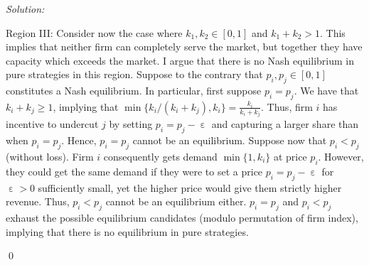 \documentclass[12pt]{article}
\DeclareMathOperator{\eps}{\varepsilon}
\newenvironment{sol}
    {\emph{Solution:}
    }
    {
    \qed
    }
\begin{document}
\begin{sol}
\begin{enumerate}[label=\alph*) ]
    Region III: Consider now the case where $k_1, k_2 \in [0,1]$ and $k_1 + k_2 > 1$. This implies that neither firm can completely serve the market, but together they have capacity which exceeds the market. I argue that there is no Nash equilibrium in pure strategies in this region. Suppose to the contrary that $p_i, p_j \in [0,1]$ constitutes a Nash equilibrium. In particular, first suppose $p_i = p_j$. We have that $k_i + k_j \geq 1$, implying that $\min\{k_i/(k_i + k_j), k_i\} = \frac{k_i}{k_i + k_j}$. Thus, firm $i$ has incentive to undercut $j$ by setting $p_i = p_j - \eps$ and capturing a larger share than when $p_i = p_j$. Hence, $p_i = p_j$ cannot be an equilibrium. Suppose now that $p_i < p_j$ (without loss). Firm $i$ consequently gets demand $\min\{1, k_i\}$ at price $p_i$. However, they could get the same demand if they were to set a price $p_i = p_j - \eps$ for $\eps > 0$ sufficiently small, yet the higher price would give them strictly higher revenue. Thus, $p_i < p_j$ cannot be an equilibrium either. $p_i = p_j$ and $p_i < p_j$ exhaust the possible equilibrium candidates (modulo permutation of firm index), implying that there is no equilibrium in pure strategies.


\end{enumerate}
\end{sol}
\end{document}
